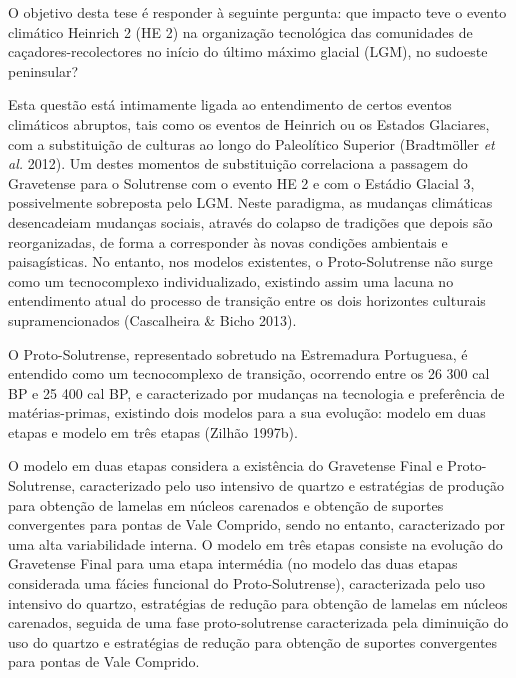 \documentclass[12pt,twoside]{reedthesis}
\begin{document}
  \begin{resumo}
    O objetivo desta tese é responder à seguinte pergunta: que impacto teve o evento climático Heinrich 2 (HE 2) na organização tecnológica das comunidades de caçadores-recolectores no início do último máximo glacial (LGM), no sudoeste peninsular?
    
    \par
    
    Esta questão está intimamente ligada ao entendimento de certos eventos climáticos abruptos, tais como os eventos de Heinrich ou os Estados Glaciares, com a substituição de culturas ao longo do Paleolítico Superior (Bradtmöller \emph{et al.} 2012). Um destes momentos de substituição correlaciona a passagem do Gravetense para o Solutrense com o evento HE 2 e com o Estádio Glacial 3, possivelmente sobreposta pelo LGM. Neste paradigma, as mudanças climáticas desencadeiam mudanças sociais, através do colapso de tradições que depois são reorganizadas, de forma a corresponder às novas condições ambientais e paisagísticas. No entanto, nos modelos existentes, o Proto-Solutrense não surge como um tecnocomplexo individualizado, existindo assim uma lacuna no entendimento atual do processo de transição entre os dois horizontes culturais supramencionados (Cascalheira \& Bicho 2013).
    
    O Proto-Solutrense, representado sobretudo na Estremadura Portuguesa, é entendido como um tecnocomplexo de transição, ocorrendo entre os 26 300 cal BP e 25 400 cal BP, e caracterizado por mudanças na tecnologia e preferência de matérias-primas, existindo dois modelos para a sua evolução: modelo em duas etapas e modelo em três etapas (Zilhão 1997b).
    
    O modelo em duas etapas considera a existência do Gravetense Final e Proto-Solutrense, caracterizado pelo uso intensivo de quartzo e estratégias de produção para obtenção de lamelas em núcleos carenados e obtenção de suportes convergentes para pontas de Vale Comprido, sendo no entanto, caracterizado por uma alta variabilidade interna. O modelo em três etapas consiste na evolução do Gravetense Final para uma etapa intermédia (no modelo das duas etapas considerada uma fácies funcional do Proto-Solutrense), caracterizada pelo uso intensivo do quartzo, estratégias de redução para obtenção de lamelas em núcleos carenados, seguida de uma fase proto-solutrense caracterizada pela diminuição do uso do quartzo e estratégias de redução para obtenção de suportes convergentes para pontas de Vale Comprido.
    

\end{resumo}
\end{document}
